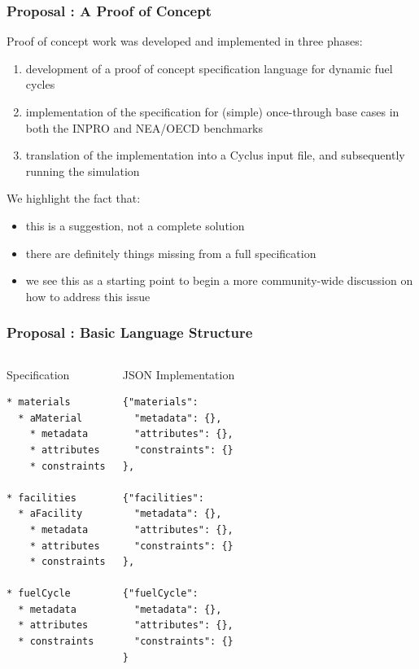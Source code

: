 
\begin{frame}[ctb!]
  \frametitle{Proposal : A Proof of Concept} 

  Proof of concept work was developed and implemented in three phases:

  \begin{enumerate}
    \item development of a proof of concept specification language for dynamic
      fuel cycles
    \item implementation of the specification for (simple) once-through base
      cases in both the INPRO and NEA/OECD benchmarks
    \item translation of the implementation into a Cyclus input file, and
      subsequently running the simulation
  \end{enumerate}

  \pause

  \vspace{0.4cm}
  
  We highlight the fact that:

  \begin{itemize}
    \item this is a suggestion, not a complete solution
    \item there are definitely things missing from a full specification
    \item we see this as a starting point to begin a more community-wide
      discussion on how to address this issue
  \end{itemize}
\end{frame}

\begin{frame}[fragile]
  \frametitle{Proposal : Basic Language Structure}
  \begin{columns}[t]
    \begin{block}{Specification}\begin{small}\begin{verbatim}
* materials
  * aMaterial
    * metadata
    * attributes
    * constraints
      
* facilities
  * aFacility
    * metadata
    * attributes
    * constraints
      
* fuelCycle
  * metadata
  * attributes
  * constraints
    \end{verbatim}\end{small}\end{block}
    \begin{block}{JSON Implementation}\begin{small}\begin{verbatim}
{"materials":     
  "metadata": {},
  "attributes": {},
  "constraints": {}
},
      
{"facilities":     
  "metadata": {},
  "attributes": {},
  "constraints": {}
},

{"fuelCycle":     
  "metadata": {},
  "attributes": {},
  "constraints": {}
}
      \end{verbatim}\end{small}\end{block}
  \end{columns}
\end{frame}

